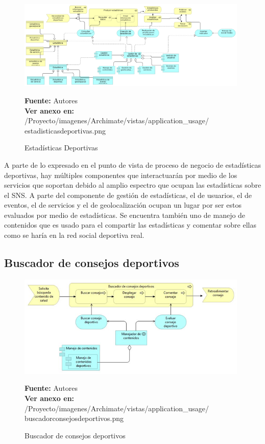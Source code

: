 \begin{figure}[!htb]
  \begin{center}
    \includegraphics[width=11cm]{./imagenes/Archimate/vistas/application_usage/estadisticasdeportivas.png}
    \caption{Estadísticas Deportivas}
    \label{fig:au_estadisticas_deportivas}
    \textbf{Fuente:}  Autores \\
    \textbf{Ver anexo en:} /Proyecto/imagenes/Archimate/vistas/application\_usage/
    estadisticasdeportivas.png
  \end{center}
\end{figure}

A parte de lo expresado en el punto de vista de proceso de negocio de estadísticas deportivas, hay múltiples componentes que interactuarán por medio de los servicios que soportan debido al amplio espectro que ocupan las estadísticas sobre el SNS. A parte del componente de gestión de estadísticas, el de usuarios, el de eventos, el de servicios y el de geolocalización ocupan un lugar por ser estos evaluados por medio de estadísticas. Se encuentra también uno de manejo de contenidos que es usado para el compartir las estadísticas y comentar sobre ellas como se haría en la red social deportiva real.

\subsection{Buscador de consejos deportivos}

\begin{figure}[!htb]
  \begin{center}
    \includegraphics[width=11cm]{./imagenes/Archimate/vistas/application_usage/buscadorconsejosdeportivos.png}
    \caption{Buscador de consejos deportivos}
    \label{fig:BP_BuscadorConsejosDeportivos}
    \textbf{Fuente:}  Autores \\
    \textbf{Ver anexo en:} /Proyecto/imagenes/Archimate/vistas/application\_usage/
    buscadorconsejosdeportivos.png
  \end{center}
\end{figure}

